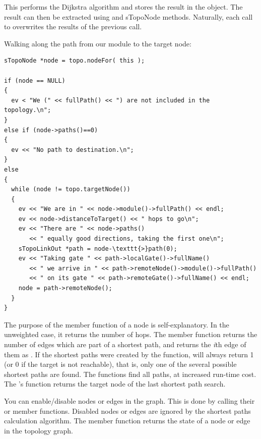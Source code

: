 This performs the Dijkstra algorithm and
stores the result in the  object. The result can
then be extracted using  and
sTopoNode methods.  Naturally, each call to
 overwrites the results of
the previous call.

Walking along the path from our module to the target node:

\begin{Verbatim}
sTopoNode *node = topo.nodeFor( this );

if (node == NULL)
{
  ev < "We (" << fullPath() << ") are not included in the topology.\n";
}
else if (node->paths()==0)
{
  ev << "No path to destination.\n";
}
else
{
  while (node != topo.targetNode())
  {
    ev << "We are in " << node->module()->fullPath() << endl;
    ev << node->distanceToTarget() << " hops to go\n";
    ev << "There are " << node->paths()
       << " equally good directions, taking the first one\n";
    sTopoLinkOut *path = node-\texttt{>}path(0);
    ev << "Taking gate " << path->localGate()->fullName()
       << " we arrive in " << path->remoteNode()->module()->fullPath()
       << " on its gate " << path->remoteGate()->fullName() << endl;
    node = path->remoteNode();
  }
}
\end{Verbatim}


The purpose of the  member function of a
node is self-explanatory. In the unweighted case, it returns the
number of hops. The  member function returns the number
of edges which are part of a shortest path, and
 returns the \textit{i}th edge of them as
. If the shortest paths were created by the
 function,
 will always return 1 (or 0 if the target is not
reachable), that is, only one of the several possible shortest paths
are found.  The
 functions
find all paths, at increased run-time cost. The 's
 function returns the target node of the last
shortest path search.

You can enable/disable nodes or edges in the graph. This is done by
calling their  or  member functions.
Disabled nodes or edges are ignored by the shortest paths calculation
algorithm. The  member function returns the state of
a node or edge in the topology graph.

